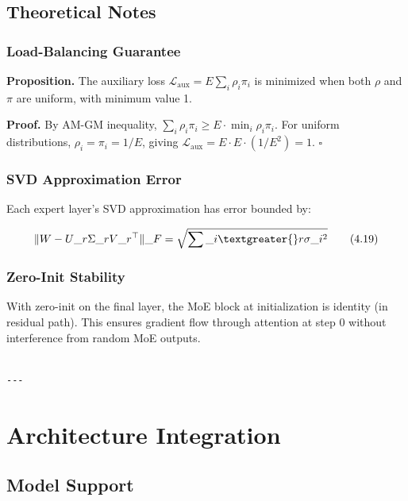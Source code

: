 \subsection{Theoretical Notes}

\subsubsection{Load-Balancing Guarantee}

\textbf{Proposition.} The auxiliary loss $\mathcal{L}_\text{aux} = E \sum_i \rho_i \pi_i$ 
is minimized when both $\rho$ and $\pi$ are uniform, with minimum value 1.

\textbf{Proof.} By AM-GM inequality, $\sum_i \rho_i \pi_i \geq E \cdot \min_i \rho_i \pi_i$. 
For uniform distributions, $\rho_i = \pi_i = 1/E$, giving $\mathcal{L}_\text{aux} = E \cdot E \cdot (1/E^2) = 1$. $\square$

\subsubsection{SVD Approximation Error}

Each expert layer's SVD approximation has error bounded by:

\[
\|W - U\_r \Sigma\_r V\_r^\top\|\_F = \sqrt{\sum\_{i \textgreater{} r} \sigma\_i^2}
\tag{4.19}
\]

\subsubsection{Zero-Init Stability}

With zero-init on the final layer, the MoE block at initialization is 
identity (in residual path). This ensures gradient flow through attention 
at step 0 without interference from random MoE outputs.
\begin{lstlisting}

---
\end{lstlisting}

\section{Architecture Integration}

\subsection{Model Support}

